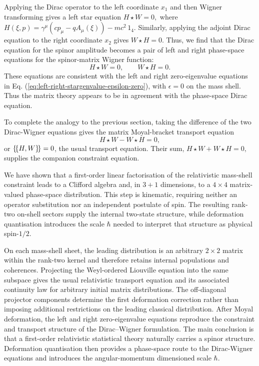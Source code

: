 \documentclass[final,5p,times,twocolumn]{elsarticle}
\begin{document}
Applying the Dirac operator to the left coordinate $x_1$ and then
Wigner transforming gives a left star equation
$
H\star W=0,
$
where
$
H(\xi,p)
=
    \gamma^\mu(c p_\mu - qA_\mu(\xi))-mc^2 \, 1_4.
$
Similarly, applying the adjoint Dirac equation to the right coordinate
$x_2$ gives
\mbox{$
W\star H=0
$}.
Thus, we find that the Dirac equation for the spinor amplitude becomes a pair of left and right phase-space equations for the spinor-matrix Wigner
function:
$$
H\star W=0,
\qquad
W\star H=0.
$$
These equations are consistent with the left and right zero-eigenvalue equations in Eq. (\ref{eq:left-right-stargenvalue-epsilon-zero}), with $\epsilon =0$ on the mass shell.
Thus the matrix theory appears to be in agreement with the phase-space Dirac equation. 

To complete the analogy to the previous section, taking the difference of the two Dirac-Wigner equations gives the matrix Moyal-bracket transport equation
$$
H\star W-W\star H=0,
$$
or $\{\!\{H,W\}\!\}=0$, the usual transport equation. Their sum,
$
H\star W+W\star H=0,
$ supplies the companion constraint equation.

We have shown that a first-order linear factorisation of the relativistic mass-shell constraint leads to a Clifford algebra and, in $3+1$ dimensions, to a $4\times4$ matrix-valued phase-space distribution. 
This step is kinematic, requiring neither an operator substitution nor an independent postulate of spin. 
The resulting rank-two on-shell sectors supply the internal two-state structure,
while deformation quantisation introduces the scale $\hbar$ needed to interpret that structure as physical spin-$1/2$.

On each mass-shell sheet, the leading distribution is an arbitrary $2\times2$ matrix within the rank-two kernel and therefore retains internal populations and coherences. Projecting the Weyl-ordered Liouville equation into the same subspace gives the usual relativistic transport equation and its associated continuity law for arbitrary initial matrix distributions. The off-diagonal projector components determine the first deformation correction rather than imposing additional restrictions on the leading classical distribution.
After Moyal deformation, the left and right zero-eigenvalue equations reproduce the constraint and transport structure of the Dirac--Wigner formulation.
The main conclusion is that a first-order relativistic statistical theory naturally carries a spinor structure. Deformation quantisation then provides a phase-space route to the Dirac-Wigner equations and introduces the angular-momentum dimensioned scale $\hbar$.
\end{document}

